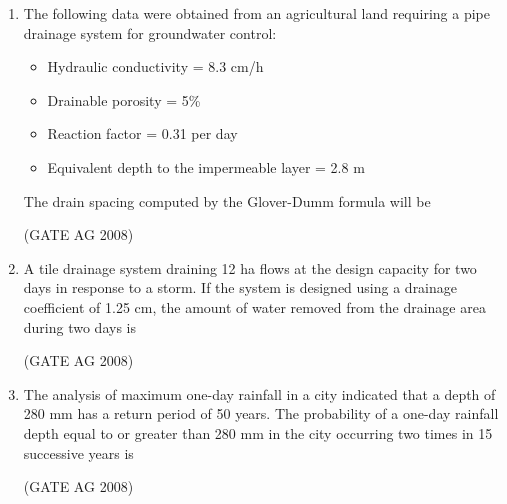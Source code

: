 \documentclass[journal,12pt,onecolumn]{IEEEtran}
\begin{document}
\begin{enumerate}
\medskip

\item 
 The following data were obtained from an agricultural land requiring a pipe drainage system for groundwater control:
\begin{itemize}
\item Hydraulic conductivity = 8.3 cm/h
\item Drainable porosity = 5\%
\item Reaction factor = 0.31 per day
\item Equivalent depth to the impermeable layer = 2.8 m
\end{itemize}

The drain spacing computed by the Glover-Dumm formula will be
\begin{enumerate}
\end{enumerate}
\hfill(GATE AG 2008)\\

\medskip

\item 
 A tile drainage system draining 12 ha flows at the design capacity for two days in response to a storm. If the system is designed using a drainage coefficient of 1.25 cm, the amount of water removed from the drainage area during two days is
\begin{enumerate}
\end{enumerate}
\hfill(GATE AG 2008)\\

\medskip

\item 
 The analysis of maximum one-day rainfall in a city indicated that a depth of 280 mm has a return period of 50 years. The probability of a one-day rainfall depth equal to or greater than 280 mm in the city occurring two times in 15 successive years is
\begin{enumerate}
\end{enumerate}
\hfill(GATE AG 2008)\\


\end{enumerate}
\end{document}
